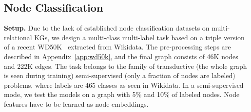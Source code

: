 \documentclass{article} \usepackage{iclr2022_conference,times}
\begin{document}
\begin{table}[t]
\centering
\caption{Inductive link prediction results, Hits@10. Best results are in \textbf{bold}, second best are \underline{underlined}.  results taken from \citet{DBLP:conf/icml/TeruDH20}. NBFNet results taken from \citet{zhu2021neural}. }
\label{tab:ilp_results}
\end{table}

\subsection{Node Classification}
\textbf{Setup.} Due to the lack of established node classification datasets on multi-relational KGs, we design a multi-class multi-label task based on a triple version of a recent WD50K~\citep{galkin-etal-2020-message} extracted from Wikidata. 
The pre-processing steps are described in Appendix~\ref{app:wd50k}, and the final graph consists of 46K nodes and 222K edges.
The task belongs to the family of transductive (the whole graph is seen during training) semi-supervised (only a fraction of nodes are labeled) problems, where labels are 465 classes as seen in Wikidata. 
In a semi-supervised mode, we test the models on a graph with 5\% and 10\% of labeled nodes.
Node features have to be learned as node embeddings.
\end{document}
